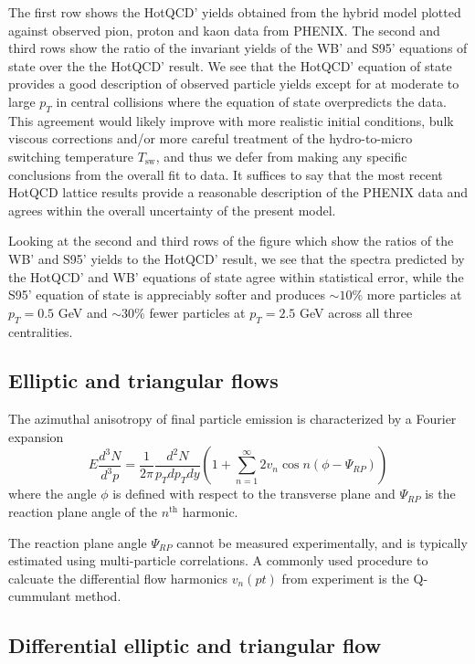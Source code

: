 \documentclass[aps,prc,reprint,amsmath,nofootinbib,superscriptaddress]{revtex4-1}
\begin{document}
The first row shows the HotQCD' yields obtained from the hybrid model plotted against observed pion, proton and kaon data from PHENIX. The second and third rows show the ratio of the invariant yields of 
the WB' and S95' equations of state over the the HotQCD' result. We see that the HotQCD' equation of state provides a good description of observed particle yields except for at moderate 
to large $p_T$ in central collisions where the equation of state overpredicts the data. This agreement would likely improve with more realistic initial conditions, bulk viscous corrections 
and/or more careful treatment of the hydro-to-micro switching temperature $T_\text{sw}$, and thus we defer from making any specific conclusions from the overall fit to data. It suffices to say that the 
most recent HotQCD lattice results provide a reasonable description of the PHENIX data and agrees within the overall uncertainty of the present model. 

Looking at the second and third rows of the figure which show the ratios of the WB' and S95' yields to the HotQCD' result, we see that the spectra predicted by the HotQCD' and WB' equations of state 
agree within statistical error, while the S95' equation of state is appreciably softer and produces $\sim 10\%$ more particles at $p_T = 0.5$ GeV and $\sim 30\%$ fewer particles at $p_T=2.5$ GeV across all three centralities.

\subsection{Elliptic and triangular flows}
\label{flow}

The azimuthal anisotropy of final particle emission is characterized by a Fourier expansion
\begin{equation}
 E \frac{d^3N}{d^3p} = \frac{1}{2\pi} \frac{d^2N}{p_T dp_T dy} \left(1 + \sum\limits_{n=1}^\infty 2 v_n \cos n(\phi - \Psi_{RP}) \right)
\end{equation}
where the angle $\phi$ is defined with respect to the transverse plane and $\Psi_{RP}$ is the reaction plane angle of the $n^\text{th}$ harmonic.

The reaction plane angle $\Psi_{RP}$ cannot be measured experimentally, and is typically estimated using multi-particle correlations. A commonly used procedure to calcuate the
differential flow harmonics $v_n(pt)$ from experiment is the Q-cummulant method.


\subsection{Differential elliptic and triangular flow}
\label{flow}
\end{document}
